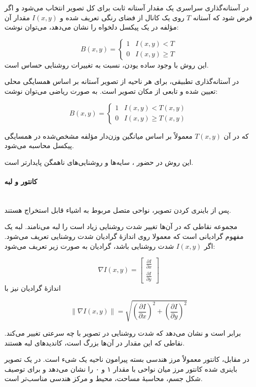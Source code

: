 \documentclass{article}
\begin{document}
در آستانه‌گذاری سراسری یک مقدار آستانه ثابت برای کل تصویر انتخاب می‌شود و اگر فرض شود که آستانه $T$ روی یک کانال از فضای رنگی تعریف شده و $I(x, y)$ مقدار آن مؤلفه‌ در یک پیکسل دلخواه را نشان می‌دهد، می‌توان نوشت: 

\[
B(x,y) =
\begin{cases}
1 & I(x,y) < T \\
0 & I(x,y) \geq T
\end{cases}
\]
این روش با وجود  ساده یودن، نسبت به تغییرات روشنایی حساس است. 

در آستانه‌گذاری تطبیقی، برای هر ناحیه از تصویر آستانه بر اساس همسایگی محلی تعیین شده و تابعی از مکان تصویر است. به صورت ریاضی می‌توان نوشت:

\[
B(x,y) =
\begin{cases}
1 & I(x,y) < T(x,y) \\
0 & I(x,y) \geq T(x,y)
\end{cases}
\]

که در آن $T(x,y)$ معمولاً بر اساس میانگین وزن‌دار مؤلفه مشخص‌شده در همسایگی پیکسل محاسبه می‌شود.

این روش در حضور ، سایه‌ها و روشنایی‌های ناهمگن پایدارتر است.


\paragraph{کانتور  و لبه }\mbox{}\\
پس از باینری کردن تصویر، نواحی متصل مربوط به اشیاء قابل استخراج هستند. 

مجموعه‌ نقاطی که در آن‌ها تغییر شدت روشنایی زیاد است را لبه می‌نامند. لبه یک مفهوم گرادیانی است که معمولا روی اندازهٔ گرادیان شدت روشنایی تعریف می‌شود. اگر $I(x,y)$ شدت روشنایی باشد، گرادیان به صورت زیر تعریف می‌شود:

\[
\nabla I(x,y) =
\begin{bmatrix}
\frac{\partial I}{\partial x} \\
\frac{\partial I}{\partial y}
\end{bmatrix}
\]
اندازهٔ گرادیان نیز با

\[
\|\nabla I(x,y)\| = \sqrt{\left(\frac{\partial I}{\partial x}\right)^2 + \left(\frac{\partial I}{\partial y}\right)^2}
\]

برابر است و نشان می‌دهد که شدت روشنایی در تصویر با چه سرعتی تغییر می‌کند. نقاطی که این مقدار در آن‌ها بزرگ است، کاندیدهای لبه هستند.

در مقابل، کانتور معمولاً مرز هندسی بسته پیرامون ناحیه یک شیء است. در یک تصویر باینری شده کانتور مرز میان نواحی با مقدار ۱ و ۰ را نشان می‌دهد و برای توصیف شکل جسم، محاسبهٔ مساحت، محیط و مرکز هندسی مناسب‌تر است.
\end{document}
